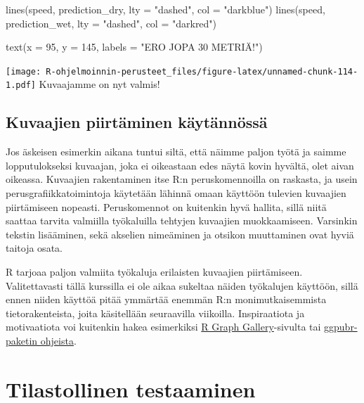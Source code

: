 \documentclass[
]{book}
\newenvironment{Shaded}{\begin{snugshade}}{\end{snugshade}}
\newcommand{\AttributeTok}[1]{\textcolor[rgb]{0.77,0.63,0.00}{#1}}
\newcommand{\DecValTok}[1]{\textcolor[rgb]{0.00,0.00,0.81}{#1}}
\newcommand{\FunctionTok}[1]{\textcolor[rgb]{0.00,0.00,0.00}{#1}}
\newcommand{\NormalTok}[1]{#1}
\newcommand{\StringTok}[1]{\textcolor[rgb]{0.31,0.60,0.02}{#1}}
\begin{document}
\begin{Shaded}
\begin{Highlighting}[]
\FunctionTok{lines}\NormalTok{(speed, prediction\_dry, }\AttributeTok{lty =} \StringTok{"dashed"}\NormalTok{, }\AttributeTok{col =} \StringTok{"darkblue"}\NormalTok{)}
\FunctionTok{lines}\NormalTok{(speed, prediction\_wet, }\AttributeTok{lty =} \StringTok{"dashed"}\NormalTok{, }\AttributeTok{col =} \StringTok{"darkred"}\NormalTok{)}

\FunctionTok{text}\NormalTok{(}\AttributeTok{x =} \DecValTok{95}\NormalTok{, }\AttributeTok{y =} \DecValTok{145}\NormalTok{, }\AttributeTok{labels =} \StringTok{"ERO JOPA 30 METRIÄ!"}\NormalTok{) }
\end{Highlighting}
\end{Shaded}

\texttt{[image: R-ohjelmoinnin-perusteet\_files/figure-latex/unnamed-chunk-114-1.pdf]}
Kuvaajamme on nyt valmis!

\hypertarget{kuvaajien-piirtuxe4minen-kuxe4ytuxe4nnuxf6ssuxe4}{%
\section{Kuvaajien piirtäminen käytännössä}\label{kuvaajien-piirtuxe4minen-kuxe4ytuxe4nnuxf6ssuxe4}}

Jos äskeisen esimerkin aikana tuntui siltä, että näimme paljon työtä ja saimme lopputulokseksi kuvaajan, joka ei oikeastaan edes näytä kovin hyvältä, olet aivan oikeassa. Kuvaajien rakentaminen itse R:n peruskomennoilla on raskasta, ja usein perusgrafiikkatoimintoja käytetään lähinnä omaan käyttöön tulevien kuvaajien piirtämiseen nopeasti. Peruskomennot on kuitenkin hyvä hallita, sillä niitä saattaa tarvita valmiilla työkaluilla tehtyjen kuvaajien muokkaamiseen. Varsinkin tekstin lisääminen, sekä akselien nimeäminen ja otsikon muuttaminen ovat hyviä taitoja osata.

R tarjoaa paljon valmiita työkaluja erilaisten kuvaajien piirtämiseen. Valitettavasti tällä kurssilla ei ole aikaa sukeltaa näiden työkalujen käyttöön, sillä ennen niiden käyttöä pitää ymmärtää enemmän R:n monimutkaisemmista tietorakenteista, joita käsitellään seuraavilla viikoilla. Inspiraatiota ja motivaatiota voi kuitenkin hakea esimerkiksi \href{https://www.r-graph-gallery.com/index.html}{R Graph Gallery}-sivulta tai \href{https://rpkgs.datanovia.com/ggpubr/index.html}{ggpubr-paketin ohjeista}.

\hypertarget{tests}{%
\chapter{Tilastollinen testaaminen}\label{tests}}
\end{document}
